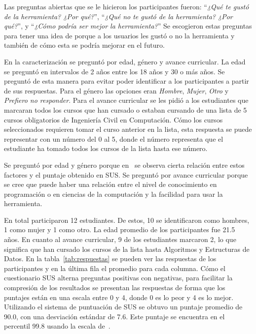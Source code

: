 Las preguntas abiertas que se le hicieron los participantes fueron: ``\textit{¿Qué te gustó de la herramienta? ¿Por qué?}'', ``\textit{¿Qué no te gustó de la herramienta? ¿Por qué?}'', y ``\textit{¿Cómo podría ser mejor la herramienta?}'' Se escogieron estas preguntas para tener una idea de porque a los usuarios les gustó o no la herramienta y también de cómo esta se podría mejorar en el futuro.

En la caracterización se preguntó por edad, género y avance curricular. La edad se preguntó en intervalos de 2 años entre los 18 años y 30 o más años. Se preguntó de esta manera para evitar poder identificar a los participantes a partir de sus respuestas. Para el género las opciones eran \textit{Hombre}, \textit{Mujer}, \textit{Otro} y \textit{Prefiero no responder}. Para el avance curricular se les pidió a los estudiantes que marcaran todos los cursos que han cursado o estaban cursando de una lista de 5 cursos obligatorios de Ingeniería Civil en Computación. Cómo los cursos seleccionados requieren tomar el curso anterior en la lista, esta respuesta se puede representar con un número del 0 al 5, donde el número representa que el estudiante ha tomado todos los cursos de la lista hasta ese número.

Se preguntó por edad y género porque en~\cite{evaluation-of-sus} se observa cierta relación entre estos factores y el puntaje obtenido en SUS. Se preguntó por avance curricular porque se cree que puede haber una relación entre el nivel de conocimiento en programación o en ciencias de la computación y la facilidad para usar la herramienta.

En total participaron 12 estudiantes. De estos, 10 se identificaron como hombres, 1 como mujer y 1 como otro. La edad promedio de los participantes fue 21.5 años. En cuanto al avance curricular, 9 de los estudiantes marcaron 2, lo que significa que han cursado los cursos de la lista hasta Algoritmos y Estructuras de Datos. En la tabla~\ref{tab:respuestas} se pueden ver las respuestas de los participantes y en la última fila el promedio para cada columna. Cómo el cuestionario SUS alterna preguntas positivas con negativas, para facilitar la compresión de los resultados se presentan las respuestas de forma que los puntajes están en una escala entre 0 y 4, donde 0 es lo peor y 4 es lo mejor. Utilizando el sistema de puntuación de SUS se obtuvo un puntaje promedio de 90.0, con una desviación estándar de 7.6. Este puntaje se encuentra en el percentil 99.8 usando la escala de~\cite{quantifying-the-user-experience}.

